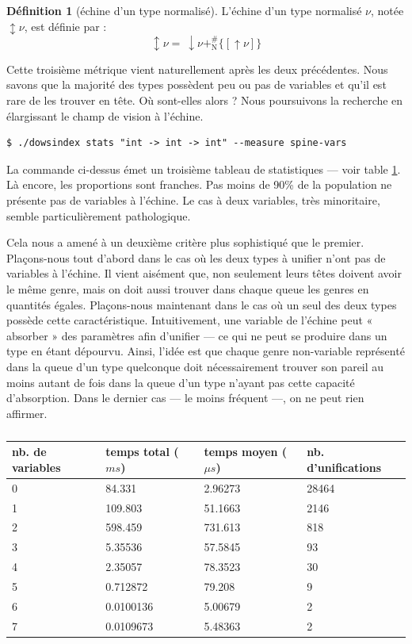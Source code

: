 \documentclass[a4paper]{report}
\theoremstyle{definition}
\newtheorem{definition}[theoreme]{Définition}
\newcommand{\mset}[1]{\{\![#1]\!\}}
\newcommand{\N}{\mathrm{N}}
\begin{document}
{\begin{definition}[échine d'un type normalisé]
  L'échine d'un type normalisé $\nu$, notée $\updownarrow \nu$, est définie par :
  \[ \updownarrow \nu =\ \downarrow \nu +^\#_\N \mset{\uparrow \nu} \]
\end{definition}

Cette troisième métrique vient naturellement après les deux précédentes. Nous savons que la majorité des types possèdent peu ou pas de variables et qu'il est rare de les trouver en tête. Où sont-elles alors ? Nous poursuivons la recherche en élargissant le champ de vision à l'échine.

\begin{verbatim}
$ ./dowsindex stats "int -> int -> int" --measure spine-vars
\end{verbatim}

La commande ci-dessus émet un troisième tableau de statistiques — voir table \ref{tab_meas3}. Là encore, les proportions sont franches. Pas moins de 90\% de la population ne présente pas de variables à l'échine. Le cas à deux variables, très minoritaire, semble particulièrement pathologique.

Cela nous a amené à un deuxième critère plus sophistiqué que le premier. Plaçons-nous tout d'abord dans le cas où les deux types à unifier n'ont pas de variables à l'échine. Il vient aisément que, non seulement leurs têtes doivent avoir le même genre, mais on doit aussi trouver dans chaque queue les genres en quantités égales. Plaçons-nous maintenant dans le cas où un seul des deux types possède cette caractéristique. Intuitivement, une variable de l'échine peut « absorber » des paramètres afin d'unifier — ce qui ne peut se produire dans un type en étant dépourvu. Ainsi, l'idée est que chaque genre non-variable représenté dans la queue d'un type quelconque doit nécessairement trouver son pareil au moins autant de fois dans la queue d'un type n'ayant pas cette capacité d'absorption. Dans le dernier cas — le moins fréquent —, on ne peut rien affirmer.

\begin{table}[h]
  \centering
  \begin{tabular}{|l|l|l|l|}
    \hline
      nb. de variables &
      temps total ($ms$) &
      temps moyen ($\mu s$) &
      nb. d'unifications
    \\
    \hline
      0 & 84.331 & 2.96273 & 28464
    \\
      1 & 109.803 & 51.1663 & 2146
    \\
      2 & 598.459 & 731.613 & 818
    \\
      3 & 5.35536 & 57.5845 & 93
    \\
      4 & 2.35057 & 78.3523 & 30
    \\
      5 & 0.712872 & 79.208 & 9
    \\
      6 & 0.0100136 & 5.00679 & 2
    \\
      7 & 0.0109673 & 5.48363 & 2
    \\
    \hline
  \end{tabular}
  \caption{\label{tab_meas3}}
\end{table}

}
\end{document}
